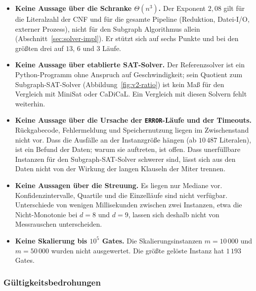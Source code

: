 \documentclass[a4paper,12pt]{article}
\theoremstyle{definition}
\begin{document}
\begin{itemize}
	\item \textbf{Keine Aussage über die Schranke $\Theta(n^3)$.} Der Exponent $2{,}08$ gilt für die Literalzahl der CNF und für die gesamte Pipeline (Reduktion, Datei-I/O, externer Prozess), nicht für den Subgraph Algorithmus allein (Abschnitt~\ref{sec:solver-impl}). Er stützt sich auf sechs Punkte und bei den größten drei auf $13$, $6$ und $3$ Läufe.
	\item \textbf{Keine Aussage über etablierte SAT-Solver.} Der Referenzsolver ist ein Python-Programm ohne Anspruch auf Geschwindigkeit; sein Quotient zum Subgraph-SAT-Solver (Abbildung~\ref{fig:v2-ratio}) ist kein Maß für den Vergleich mit MiniSat oder CaDiCaL. Ein Vergleich mit diesen Solvern fehlt weiterhin.
	\item \textbf{Keine Aussage über die Ursache der \texttt{ERROR}-Läufe und der Timeouts.} Rückgabecode, Fehlermeldung und Speichernutzung liegen im Zwischenstand nicht vor. Dass die Ausfälle an der Instanzgröße hängen (ab $10\,487$ Literalen), ist ein Befund der Daten; warum sie auftreten, ist offen. Dass unerfüllbare Instanzen für den Subgraph-SAT-Solver schwerer sind, lässt sich aus den Daten nicht von der Wirkung der langen Klauseln der Miter trennen.
	\item \textbf{Keine Aussagen über die Streuung.} Es liegen nur Mediane vor. Konfidenzintervalle, Quartile und die Einzelläufe sind nicht verfügbar. Unterschiede von wenigen Millisekunden zwischen zwei Instanzen, etwa die Nicht-Monotonie bei $d=8$ und $d=9$, lassen sich deshalb nicht von Messrauschen unterscheiden.
	\item \textbf{Keine Skalierung bis $10^5$ Gates.} Die Skalierungsinstanzen $m=10\,000$ und $m=50\,000$ wurden nicht ausgewertet. Die größte gelöste Instanz hat $1\,193$ Gates.
\end{itemize}

\subsubsection{Gültigkeitsbedrohungen}
\end{document}
